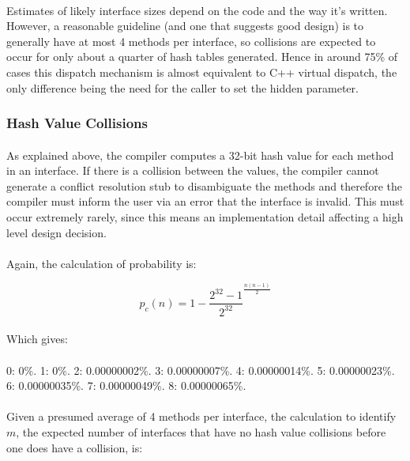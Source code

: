\documentclass[12pt,twoside,notitlepage]{report}
\begin{document}
\paragraph{}
Estimates of likely interface sizes depend on the code and the way it's written. However, a reasonable guideline (and one that suggests good design) is to generally have at most 4 methods per interface, so collisions are expected to occur for only about a quarter of hash tables generated. Hence in around 75\% of cases this dispatch mechanism is almost equivalent to C++ virtual dispatch, the only difference being the need for the caller to set the hidden parameter.

\subsubsection{Hash Value Collisions}

\paragraph{}
As explained above, the compiler computes a 32-bit hash value for each method in an interface. If there is a collision between the values, the compiler cannot generate a conflict resolution stub to disambiguate the methods and therefore the compiler must inform the user via an error that the interface is invalid. This must occur extremely rarely, since this means an implementation detail affecting a high level design decision.

\paragraph{}
Again, the calculation of probability is:

$$p_{c}(n) = 1 − \frac{2^32 - 1}{2^32}^\frac{n(n − 1)}{2}$$

\paragraph{}
Which gives:

\paragraph{}
0: 0\%.
1: 0\%.
2: 0.00000002\%.
3: 0.00000007\%.
4: 0.00000014\%.
5: 0.00000023\%.
6: 0.00000035\%.
7: 0.00000049\%.
8: 0.00000065\%.

\paragraph{}
Given a presumed average of 4 methods per interface, the calculation to identify $m$, the expected number of interfaces that have no hash value collisions before one does have a collision, is:
\end{document}
